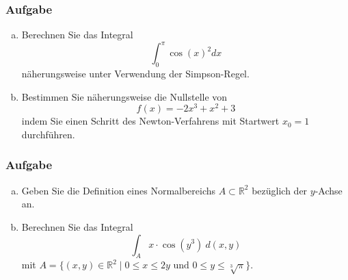 \documentclass[a4paper,11pt]{scrartcl}
\newcounter{auf}
\newcommand{\Aufgabe}%
        {\addtocounter{auf}{1} \subsubsection*{\rmfamily  Aufgabe \theauf \hspace{1em}} }
\newcommand{\RR}{\mathbb{R}}
\begin{document}
\newpage
\Aufgabe
\begin{enumerate}[a)]
\item Berechnen Sie das Integral
$$
\int_0^\pi \cos(x)^2 dx
$$
näherungsweise unter Verwendung
der Simpson-Regel.
\item Bestimmen Sie näherungsweise die Nullstelle von 
$$
f(x)=-2x^3+x^2+3
$$
indem Sie einen Schritt des Newton-Verfahrens mit Startwert $x_0=1$ durchführen.
\end{enumerate}
%
%


\newpage
\Aufgabe


\begin{enumerate}[a)]
\item Geben Sie die Definition eines Normalbereichs $A\subset \RR^2$ bezüglich der $y$-Achse an.
\item Berechnen Sie das Integral
$$
\int_A x\cdot \cos(y^3)\ d(x,y)
$$
mit $A=\{(x,y) \in \RR^2 \mid 0\le x \le 2y \text { und } 0 \le y \le \sqrt[3]{\pi} \}$.
\end{enumerate}
%
%
%
%
\end{document}
